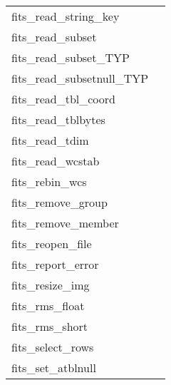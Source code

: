 \documentclass[11pt]{book}
\begin{document}
\begin{tabular}{lr}
fits\_read\_string\_key & \pageref{ffgsky} \\
fits\_read\_subset  & \pageref{ffgsv} \\
fits\_read\_subset\_TYP  & \pageref{ffgsvx} \pageref{ffgsvx2}\\
fits\_read\_subsetnull\_TYP & \pageref{ffgsfx} \pageref{ffgsfx2} \\
fits\_read\_tbl\_coord & \pageref{ffgtcs} \\
fits\_read\_tblbytes    & \pageref{ffgtbb} \\
fits\_read\_tdim         & \pageref{ffgtdm} \\
fits\_read\_wcstab       & \pageref{wcstab} \\
fits\_rebin\_wcs  &  \pageref{rebinwcs} \\
fits\_remove\_group  & \pageref{ffgtrm} \\
fits\_remove\_member   & \pageref{ffgmrm} \\
fits\_reopen\_file      & \pageref{ffreopen} \\
fits\_report\_error   & \pageref{ffrprt} \\
fits\_resize\_img     & \pageref{ffrsim} \\
fits\_rms\_float      & \pageref{imageRMS} \\
fits\_rms\_short      & \pageref{imageRMS} \\
fits\_select\_rows  & \pageref{ffsrow} \\
fits\_set\_atblnull   & \pageref{ffsnul} \\
\end{tabular}
\end{document}
